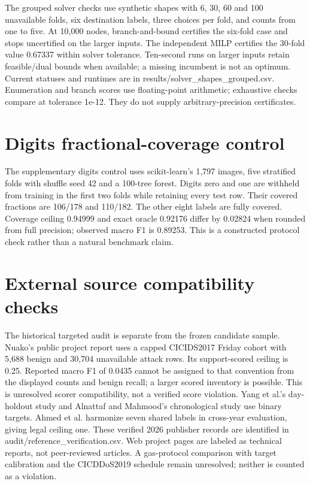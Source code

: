 \documentclass{article}
\begin{document}
The grouped solver checks use synthetic shapes with 6, 30, 60 and 100 unavailable folds, six destination labels, three choices per fold, and counts from one to five. At 10,000 nodes, branch-and-bound certifies the six-fold case and stops uncertified on the larger inputs. The independent MILP certifies the 30-fold value 0.67337 within solver tolerance. Ten-second runs on larger inputs retain feasible/dual bounds when available; a missing incumbent is not an optimum. Current statuses and runtimes are in results/solver\_shapes\_grouped.csv. Enumeration and branch scores use floating-point arithmetic; exhaustive checks compare at tolerance 1e-12. They do not supply arbitrary-precision certificates.

\section*{Digits fractional-coverage control}
The supplementary digits control uses scikit-learn's 1,797 images, five stratified folds with shuffle seed 42 and a 100-tree forest. Digits zero and one are withheld from training in the first two folds while retaining every test row. Their covered fractions are 106/178 and 110/182. The other eight labels are fully covered. Coverage ceiling 0.94999 and exact oracle 0.92176 differ by 0.02824 when rounded from full precision; observed macro F1 is 0.89253. This is a constructed protocol check rather than a natural benchmark claim.

\section*{External source compatibility checks}
The historical targeted audit is separate from the frozen candidate sample. Nuako's public project report \cite{nuako2026} uses a capped CICIDS2017 Friday cohort with 5,688 benign and 30,704 unavailable attack rows. Its support-scored ceiling is 0.25. Reported macro F1 of 0.0435 cannot be assigned to that convention from the displayed counts and benign recall; a larger scored inventory is possible. This is unresolved scorer compatibility, not a verified score violation. Yang et al.'s day-holdout study \cite{yang2026} and Alnattaf and Mahmood's chronological study \cite{alnattaf2026} use binary targets. Ahmed et al. \cite{ahmed2026} harmonize seven shared labels in cross-year evaluation, giving legal ceiling one. These verified 2026 publisher records are identified in audit/reference\_verification.csv. Web project pages are labeled as technical reports, not peer-reviewed articles. A gas-protocol comparison with target calibration and the CICDDoS2019 schedule remain unresolved; neither is counted as a violation.
\end{document}
